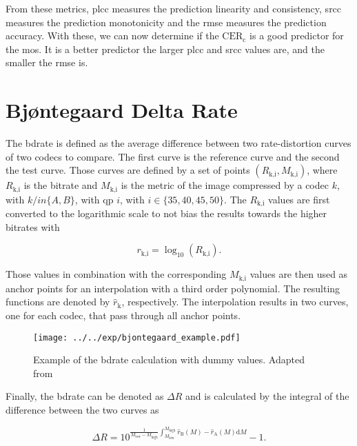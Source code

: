 From these metrics, \gls{plcc} measures the prediction linearity and consistency, \gls{srcc} measures the prediction monotonicity and the \gls{rmse} measures the prediction accuracy.
With these, we can now determine if the $\text{CER}_{\text{c}}$ is a good predictor for the \gls{mos}.
It is a better predictor the larger \gls{plcc} and \gls{srcc} values are, and the smaller the \gls{rmse} is.


\section{Bjøntegaard Delta Rate}
\label{subsec:bdrate}

The \gls{bdrate} \cite{bdrate_original_2001}\cite{bdrate_beyond_2022} is defined as the average difference between two rate-distortion curves of two codecs to compare.
The first curve is the reference curve and the second the test curve.
Those curves are defined by a set of points $(R_{\text{k,i}}, M_{\text{k,i}})$, where $R_{\text{k,i}}$ is the bitrate and $M_{\text{k,i}}$ is the metric of the image compressed by a codec $k$, with $k /in \{A,B\}$, with \gls{qp} $i$, with $i \in \{35,40,45,50\}$.
The $R_{\text{k,i}}$ values are first converted to the logarithmic scale to not bias the results towards the higher bitrates with

\begin{equation}
    r_{\text{k,i}} = \log_{10}\left(R_{\text{k,i}}\right).
    \label{eq:log_scale}
\end{equation}

Those values in combination with the corresponding $M_{\text{k,i}}$ values are then used as anchor points for an interpolation with a third order polynomial.
The resulting functions are denoted by $\hat{r}_{\text{k}}$, respectively.
The interpolation results in two curves, one for each codec, that pass through all anchor points.

\begin{figure}
    \centering
    \texttt{[image: ../../exp/bjontegaard\_example.pdf]}
    \caption{Example of the \gls{bdrate} calculation with dummy values. Adapted from \cite{bdrate_beyond_2022}}
    \label{fig:bdrate_example}
\end{figure}

Finally, the \gls{bdrate} can be denoted as $\Delta R$ and is calculated by the integral of the difference between the two curves as

\begin{equation}
    \Delta R = 10^{\frac{1}{M_{\text{low}}-M_{\text{high}}} \int_{M_{\text{low}}}^{M_{\text{high}}} \hat{r}_{\text{B}}(M) - \hat{r}_{\text{A}}(M) \text{d}M} - 1.
    \label{eq:bdrate}
\end{equation}

